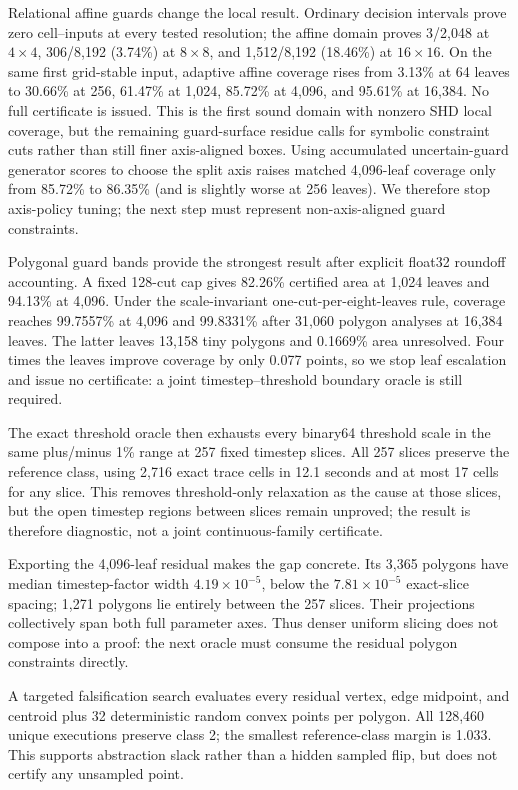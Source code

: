 Relational affine guards change the local result. Ordinary decision intervals
prove zero cell--inputs at every tested resolution; the affine domain proves
3/2,048 at $4\times4$, 306/8,192 (3.74\%) at $8\times8$, and 1,512/8,192
(18.46\%) at $16\times16$. On the same first grid-stable input, adaptive affine
coverage rises from 3.13\% at 64 leaves to 30.66\% at 256, 61.47\% at 1,024,
85.72\% at 4,096, and 95.61\% at 16,384. No full certificate is issued. This is
the first sound domain with nonzero SHD local coverage, but the remaining
guard-surface residue calls for symbolic constraint cuts rather than still finer
axis-aligned boxes.
Using accumulated uncertain-guard generator scores to choose the split axis
raises matched 4,096-leaf coverage only from 85.72\% to 86.35\% (and is slightly
worse at 256 leaves). We therefore stop axis-policy tuning; the next step must
represent non-axis-aligned guard constraints.

Polygonal guard bands provide the strongest result after explicit float32
roundoff accounting. A fixed 128-cut cap gives 82.26\% certified area at 1,024
leaves and 94.13\% at 4,096. Under the scale-invariant one-cut-per-eight-leaves
rule, coverage reaches 99.7557\% at 4,096 and 99.8331\% after 31,060 polygon
analyses at 16,384 leaves. The latter leaves 13,158 tiny polygons and 0.1669\%
area unresolved. Four times the leaves improve coverage by only 0.077 points,
so we stop leaf escalation and issue no certificate: a joint
timestep--threshold boundary oracle is still required.

The exact threshold oracle then exhausts every binary64 threshold scale in the
same plus/minus 1\% range at 257 fixed timestep slices. All 257 slices preserve
the reference class, using 2,716 exact trace cells in 12.1 seconds and at most
17 cells for any slice. This removes threshold-only relaxation as the cause at
those slices, but the open timestep regions between slices remain unproved; the
result is therefore diagnostic, not a joint continuous-family certificate.

Exporting the 4,096-leaf residual makes the gap concrete. Its 3,365 polygons
have median timestep-factor width $4.19\times10^{-5}$, below the
$7.81\times10^{-5}$ exact-slice spacing; 1,271 polygons lie entirely between
the 257 slices. Their projections collectively span both full parameter axes.
Thus denser uniform slicing does not compose into a proof: the next oracle must
consume the residual polygon constraints directly.

A targeted falsification search evaluates every residual vertex, edge midpoint,
and centroid plus 32 deterministic random convex points per polygon. All 128,460
unique executions preserve class 2; the smallest reference-class margin is
1.033. This supports abstraction slack rather than a hidden sampled flip, but
does not certify any unsampled point.

